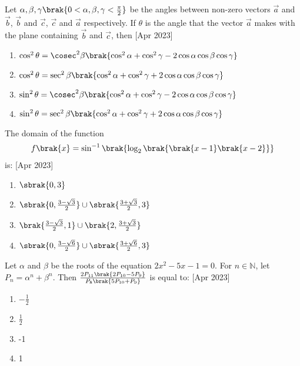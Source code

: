  \item Let $\alpha, \beta, \gamma \brak{0 < \alpha, \beta, \gamma < \frac{\pi}{2}}$ be the angles between non-zero vectors $\vec{a}$ and $\vec{b}$, $\vec{b}$ and $\vec{c}$, $\vec{c}$ and $\vec{a}$ respectively. If $\theta$ is the angle that the vector $\vec{a}$ makes with the plane containing $\vec{b}$ and $\vec{c}$, then \hfill[Apr 2023]
 \begin{enumerate}
     \item $\cos^2\theta = \cosec^2\beta\brak{\cos^2\alpha + \cos^2\gamma - 2\cos\alpha\cos\beta\cos\gamma}$
     \item $\cos^2\theta = \sec^2\beta\brak{\cos^2\alpha + \cos^2\gamma + 2\cos\alpha\cos\beta\cos\gamma}$
     \item $\sin^2\theta = \cosec^2\beta\brak{\cos^2\alpha + \cos^2\gamma - 2\cos\alpha\cos\beta\cos\gamma}$
     \item $\sin^2\theta = \sec^2\beta\brak{\cos^2\alpha + \cos^2\gamma + 2\cos\alpha\cos\beta\cos\gamma}$ \\
 \end{enumerate}
\item The domain of the function
\begin{align*}
    f\brak{x} = \sin^{-1}\brak{\log_2\brak{\brak{x-1}\brak{x-2}}}
\end{align*}
is: \hfill[Apr 2023]
\begin{enumerate}
     \item $\sbrak{0, 3}$
     \item $\sbrak{0, \frac{3-\sqrt{3}}{2}}\cup\sbrak{\frac{3+\sqrt{3}}{2}, 3}$
     \item $\brak{\frac{3-\sqrt{3}}{2}, 1}\cup\brak{2, \frac{3+\sqrt{3}}{2}}$
     \item $\sbrak{0, \frac{3-\sqrt{6}}{2}}\cup\sbrak{\frac{3+\sqrt{6}}{2}, 3}$ \\
 \end{enumerate}
\item Let $\alpha$ and $\beta$ be the roots of the equation $2x^2 - 5x - 1 = 0$. For $n\in\mathbb{N}$, let $P_n = \alpha^n + \beta^n$. Then $\frac{2P_{11}\brak{2P_{10}-5P_9}}{P_8\brak{5P_{10}+P_9}}$ is equal to: \hfill[Apr 2023]
\begin{enumerate}
    \item $-\frac{1}{2}$
    \item $\frac{1}{2}$
    \item -1
    \item 1\\
\end{enumerate}
